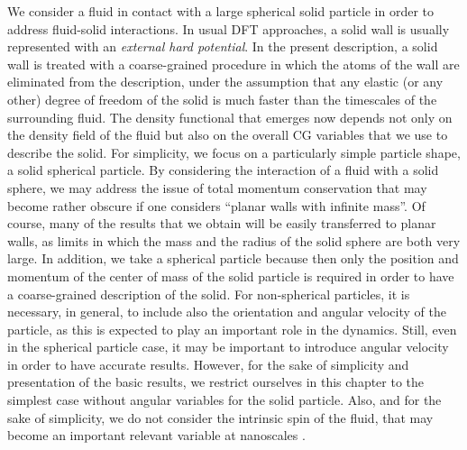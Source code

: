\documentclass[b5paper,openright,10pt]{book}
\begin{document}
We consider a fluid in contact with a 
large  spherical  solid  particle  in  order  to  address  fluid-solid
interactions.   In  usual DFT  approaches,  a  solid wall  is  usually
represented with  an {\em  external hard  potential}.  In  the present
description, a solid  wall is treated with  a coarse-grained procedure
in which  the atoms of the  wall are eliminated from  the description,
under the assumption that any elastic (or any other) degree of freedom
of the  solid is much faster  than the timescales  of the surrounding
fluid.  The  density functional that  emerges now depends not  only on
the density  field of the fluid  but also on the  overall CG variables
that we use to describe the solid.  For simplicity, we focus on a particularly simple particle shape, a solid spherical particle.  By considering the interaction of a  fluid with a solid sphere, we  may address the issue
of total momentum  conservation that may become rather  obscure if one
considers ``planar walls with infinite mass''. Of course, many of the
results that we obtain will be  easily transferred to planar walls, as
limits in which the  mass and the radius of the  solid sphere are both
very large.   In addition, we  take a spherical particle  because then
only the  position and  momentum of  the center of  mass of  the solid
particle is required in order  to have a coarse-grained description of
the solid.  For non-spherical particles,  it is necessary, in general,
to include also the orientation  and angular velocity of the particle,
as this is expected to play an important role in the dynamics.  Still,
even in the spherical particle case,  it may be important to introduce
angular velocity in order to  have accurate results.  However, for the
sake of simplicity and presentation  of the basic results, we restrict
ourselves in this chapter to the simplest case without angular variables
for the  solid particle. Also, and  for the sake of  simplicity, we do
not  consider the  intrinsic spin  of the  fluid, that  may become  an
important        relevant         variable        at        nanoscales
\cite{Hansen2009,Hansen2011a}.
\end{document}
